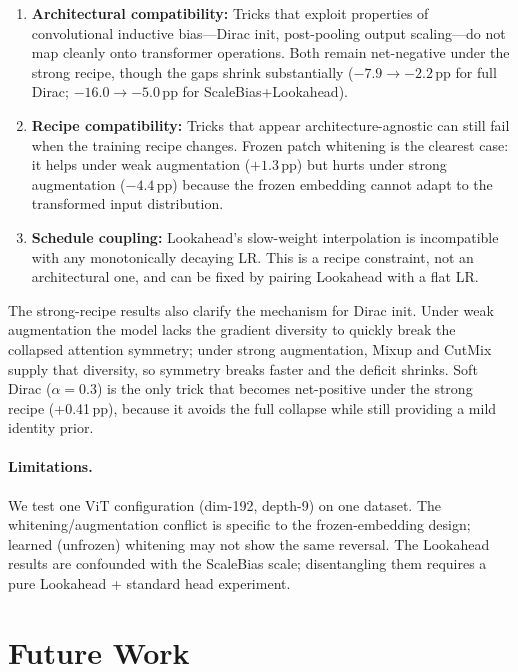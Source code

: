 \documentclass[10pt,twocolumn]{article}
\newcommand{\pp}{\,pp}   %
\begin{document}
\begin{enumerate}[leftmargin=*, topsep=2pt, itemsep=2pt]
    \item \textbf{Architectural compatibility:} Tricks that exploit properties of convolutional inductive bias---Dirac init, post-pooling output scaling---do not map cleanly onto transformer operations.
          Both remain net-negative under the strong recipe, though the gaps shrink substantially ($-7.9 \to -2.2$\pp{} for full Dirac; $-16.0 \to -5.0$\pp{} for ScaleBias+Lookahead).
    \item \textbf{Recipe compatibility:} Tricks that appear architecture-agnostic can still fail when the training recipe changes.
          Frozen patch whitening is the clearest case: it helps under weak augmentation ($+1.3$\pp{}) but hurts under strong augmentation ($-4.4$\pp{}) because the frozen embedding cannot adapt to the transformed input distribution.
    \item \textbf{Schedule coupling:} Lookahead's slow-weight interpolation is incompatible with any monotonically decaying LR.
          This is a recipe constraint, not an architectural one, and can be fixed by pairing Lookahead with a flat LR.
\end{enumerate}

The strong-recipe results also clarify the mechanism for Dirac init.
Under weak augmentation the model lacks the gradient diversity to quickly break the collapsed attention symmetry; under strong augmentation, Mixup and CutMix supply that diversity, so symmetry breaks faster and the deficit shrinks.
Soft Dirac ($\alpha{=}0.3$) is the only trick that becomes net-positive under the strong recipe (+0.41\pp{}), because it avoids the full collapse while still providing a mild identity prior.

\paragraph{Limitations.}
We test one ViT configuration (dim-192, depth-9) on one dataset.
The whitening/augmentation conflict is specific to the frozen-embedding design; learned (unfrozen) whitening may not show the same reversal.
The Lookahead results are confounded with the ScaleBias scale; disentangling them requires a pure Lookahead + standard head experiment.

\section{Future Work}\label{sec:future}
\end{document}
